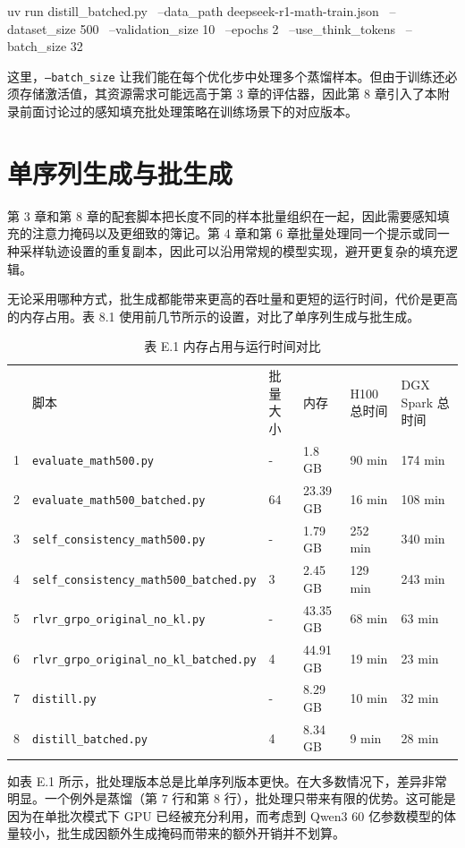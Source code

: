 \begin{codebox}
uv run distill_batched.py \
  --data_path deepseek-r1-math-train.json \
  --dataset_size 500 \
  --validation_size 10 \
  --epochs 2 \
  --use_think_tokens \
  --batch_size 32
\end{codebox}

这里，\texttt{--batch\_size} 让我们能在每个优化步中处理多个蒸馏样本。但由于训练还必须存储激活值，其资源需求可能远高于第 3 章的评估器，因此第 8 章引入了本附录前面讨论过的感知填充批处理策略在训练场景下的对应版本。

\section{单序列生成与批生成}

第 3 章和第 8 章的配套脚本把长度不同的样本批量组织在一起，因此需要感知填充的注意力掩码以及更细致的簿记。第 4 章和第 6 章批量处理同一个提示或同一种采样轨迹设置的重复副本，因此可以沿用常规的模型实现，避开更复杂的填充逻辑。

无论采用哪种方式，批生成都能带来更高的吞吐量和更短的运行时间，代价是更高的内存占用。表 8.1 使用前几节所示的设置，对比了单序列生成与批生成。

\begin{table}[htbp]
\centering\small
\centering
\caption{表 E.1 内存占用与运行时间对比}
\begin{tabularx}{\linewidth}{@{}c@{}XXXXX}
\toprule
 & 脚本 & 批量大小 & 内存 & H100 总时间 & DGX Spark 总时间 \\
1 & \texttt{evaluate\_\allowbreak{}math500.py} & - & 1.8 GB & 90 min & 174 min \\
2 & \texttt{evaluate\_\allowbreak{}math500\_\allowbreak{}batched.py} & 64 & 23.39 GB & 16 min & 108 min \\ \addlinespace

3 & \texttt{self\_\allowbreak{}consistency\_\allowbreak{}math500.py} & - & 1.79 GB & 252 min & 340 min \\
4 & \texttt{self\_\allowbreak{}consistency\_\allowbreak{}math500\_\allowbreak{}batched.py} & 3 & 2.45 GB & 129 min & 243 min \\ \addlinespace

5 & \texttt{rlvr\_\allowbreak{}grpo\_\allowbreak{}original\_\allowbreak{}no\_\allowbreak{}kl.py} & - & 43.35 GB & 68 min & 63 min \\
6 & \texttt{rlvr\_\allowbreak{}grpo\_\allowbreak{}original\_\allowbreak{}no\_\allowbreak{}kl\_\allowbreak{}batched.py} & 4 & 44.91 GB & 19 min & 23 min \\ \addlinespace

7 & \texttt{distill\allowbreak{}.py} & - & 8.29 GB & 10 min & 32 min \\
8 & \texttt{distill\_\allowbreak{}batched.py} & 4 & 8.34 GB & 9 min & 28 min \\ \bottomrule
\end{tabularx}
\end{table}

如表 E.1 所示，批处理版本总是比单序列版本更快。在大多数情况下，差异非常明显。一个例外是蒸馏（第 7 行和第 8 行），批处理只带来有限的优势。这可能是因为在单批次模式下 GPU 已经被充分利用，而考虑到 Qwen3 60 亿参数模型的体量较小，批生成因额外生成掩码而带来的额外开销并不划算。
